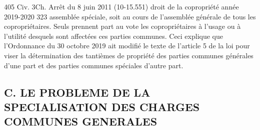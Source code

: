 		405 Civ. 3\degres Ch. Arrêt  du 8 juin 2011 (10-15.551)
		droit de la copropriété année 2019-2020
		323
		assemblée spéciale, soit au cours de l'assemblée générale de tous les copropriétaires. Seuls prennent part au vote les copropriétaires à l'usage ou à l'utilité desquels sont affectées ces parties communes.
		Ceci explique que l’Ordonnance du 30 octobre 2019 ait modifié le texte de l’article 5 de la loi pour viser la détermination des tantièmes de propriété des parties communes générales d’une part et des parties communes spéciales d’autre part.
	
	\subsection{C. LE PROBLEME DE LA SPECIALISATION DES CHARGES COMMUNES GENERALES}
	
